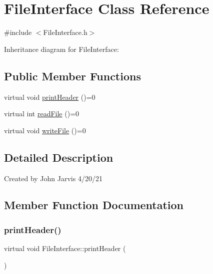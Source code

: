 \hypertarget{classFileInterface}{}\section{File\+Interface Class Reference}
\label{classFileInterface}


{\ttfamily \#include $<$File\+Interface.\+h$>$}



Inheritance diagram for File\+Interface\+:
\subsection*{Public Member Functions}
\begin{DoxyCompactItemize}
\item 
virtual void \hyperlink{classFileInterface_acfd092493ecf4f466d57721fbfdd8b23}{print\+Header} ()=0
\item 
virtual int \hyperlink{classFileInterface_ad6a8364f2255b7d724622eb8828b2c1c}{read\+File} ()=0
\item 
virtual void \hyperlink{classFileInterface_a46344a063894f43e2594f4dca786756a}{write\+File} ()=0
\end{DoxyCompactItemize}


\subsection{Detailed Description}
Created by John Jarvis 4/20/21 

\subsection{Member Function Documentation}
\mbox{\label{classFileInterface_acfd092493ecf4f466d57721fbfdd8b23}} 
\subsubsection{\texorpdfstring{print\+Header()}{printHeader()}}
{\footnotesize\ttfamily virtual void File\+Interface\+::print\+Header (\begin{DoxyParamCaption}{ }\end{DoxyParamCaption})\hspace{0.3cm}{\ttfamily [pure virtual]}}

